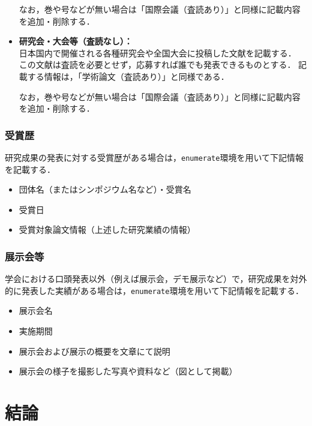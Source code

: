 \documentclass[a4j,11pt]{ujreport}
\begin{document}
\begin{itemize}
なお，巻や号などが無い場合は「国際会議（査読あり）」と同様に記載内容を追加・削除する．

\item {\bf 研究会・大会等（査読なし）：}\\
日本国内で開催される各種研究会や全国大会に投稿した文献を記載する．
この文献は査読を必要とせず，応募すれば誰でも発表できるものとする．
記載する情報は，「学術論文（査読あり）」と同様である．

なお，巻や号などが無い場合は「国際会議（査読あり）」と同様に記載内容を追加・削除する．
\end{itemize}

\subsection{受賞歴}
研究成果の発表に対する受賞歴がある場合は，\texttt{enumerate}環境を用いて下記情報を記載する．

\begin{itemize}
\item 団体名（またはシンポジウム名など）・受賞名
\item 受賞日
\item 受賞対象論文情報（上述した研究業績の情報）
\end{itemize}

\subsection{展示会等}
学会における口頭発表以外（例えば展示会，デモ展示など）で，研究成果を対外的に発表した実績がある場合は，\texttt{enumerate}環境を用いて下記情報を記載する．

\begin{itemize}
\item 展示会名
\item 実施期間
\item 展示会および展示の概要を文章にて説明
\item 展示会の様子を撮影した写真や資料など（図として掲載）
\end{itemize}


\chapter{結論}\label{chap:Conclusion}
\end{document}
